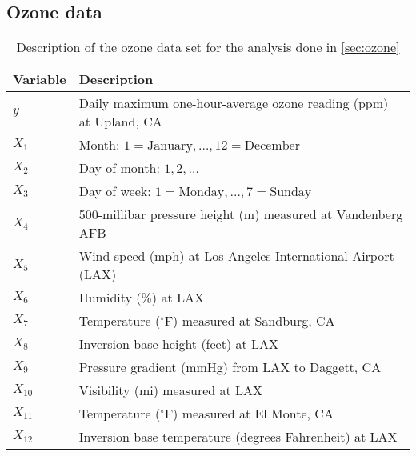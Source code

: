 \subsection{Ozone data}
\label{apx:ozone}

\begin{table}[H]
\centering
\caption{Description of the ozone data set for the analysis done in \cref{sec:ozone}}
\label{tab:ozone}
\begin{tabular}{ll}
\toprule
Variable     & Description \\
\midrule
$y$      & Daily maximum one-hour-average ozone reading (ppm) at Upland, CA \\
$X_1$    & Month: $1 = \text{January}, \dots, 12 = \text{December}$\\
$X_2$    & Day of month: $1,2,\dots$ \\
$X_3$    & Day of week: $1 = \text{Monday}, \dots, 7 = \text{Sunday}$ \\
$X_4$    & 500-millibar pressure height (m) measured at Vandenberg AFB \\
$X_5$    & Wind speed (mph) at Los Angeles International Airport (LAX) \\
$X_6$    & Humidity (\%) at LAX \\
$X_7$    & Temperature ($^\circ$F) measured at Sandburg, CA \\
$X_8$    & Inversion base height (feet) at LAX \\
$X_9$    & Pressure gradient (mmHg) from LAX to Daggett, CA \\
$X_{10}$ & Visibility (mi) measured at LAX \\
$X_{11}$ & Temperature ($^\circ$F) measured at El Monte, CA \\      
$X_{12}$ & Inversion base temperature (degrees Fahrenheit) at LAX \\             
\end{tabular}

\end{table}
